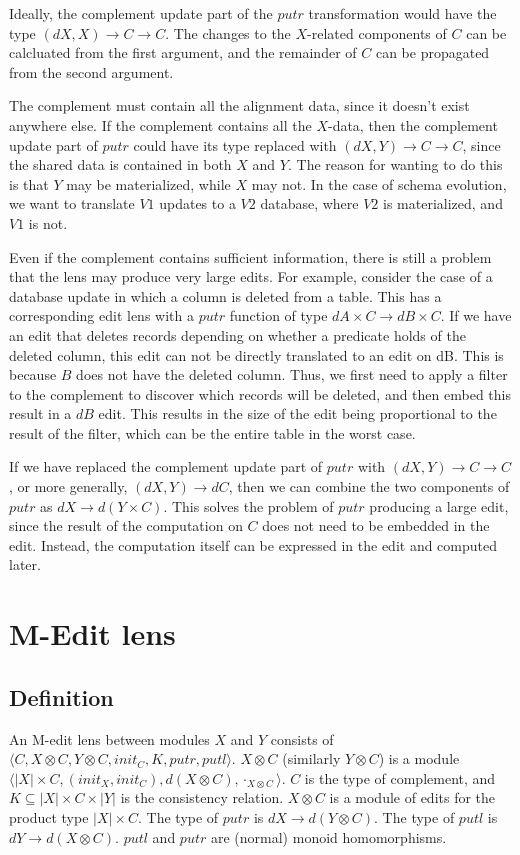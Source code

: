 \documentclass[a4paper,10pt]{article}
\begin{document}
Ideally, the complement update part of the $putr$ transformation would have the type $(dX, X) \to C \to C$. The changes to the $X$-related components of $C$ can be calcluated from the first argument, and the remainder of $C$ can be propagated from the second argument. 

The complement must contain all the alignment data, since it doesn't exist anywhere else. If the complement contains all the $X$-data, then the complement update part of $putr$ could have its type replaced with $(dX, Y) \to C \to C$, since the shared data is contained in both $X$ and $Y$. The reason for wanting to do this is that $Y$ may be materialized, while $X$ may not. 
In the case of schema evolution, we want to translate $V1$ updates to a $V2$ database, where $V2$ is materialized, and $V1$ is not.

Even if the complement contains sufficient information, there is still a problem that the lens may produce very large edits. For example, consider the case of a database update in which a column is deleted from a table. This has a corresponding edit lens with a $putr$ function of type $dA \times C \to dB \times C$. If we have an edit that deletes records depending on whether a predicate holds of the deleted column, this edit can not be directly translated to an edit on dB. This is because $B$ does not have the deleted column. Thus, we first need to apply a filter to the complement to discover which records will be deleted, and then embed this result in a $dB$ edit. This results in the size of the edit being proportional to the result of the filter, which can be the entire table in the worst case.

If we have replaced the complement update part of $putr$ with $(dX, Y) \to C \to C$, or more generally, $(dX, Y) \to dC$, then we can combine the two components of $putr$ as $dX \to d(Y \times C)$. This solves the problem of $putr$ producing a large edit, since the result of the computation on $C$ does not need to be embedded in the edit. Instead, the computation itself can be expressed in the edit and computed later.

\section{M-Edit lens}

\subsection{Definition}
An M-edit lens between modules $X$ and $Y$ consists of $\langle C, X \otimes C, Y \otimes C, init_C, K, putr, putl \rangle$. $X \otimes C$ (similarly $Y \otimes C$) is a module $\langle |X| \times C, (init_X, init_C), d(X \otimes C), \cdot_{X \otimes C} \rangle$. $C$ is the type of complement, and $K \subseteq |X| \times C \times |Y|$ is the consistency relation. $X \otimes C$ is a module of edits for the product type $|X| \times C$. The type of $putr$ is $dX \to d(Y \otimes C)$. The type of $putl$ is $dY \to d(X \otimes C)$. $putl$ and $putr$ are (normal) monoid homomorphisms.
\end{document}
